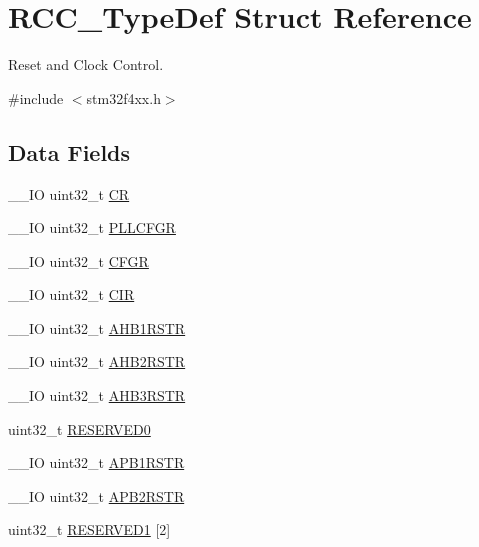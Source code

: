 \hypertarget{struct_r_c_c___type_def}{\section{R\-C\-C\-\_\-\-Type\-Def Struct Reference}
\label{struct_r_c_c___type_def}
}


Reset and Clock Control.  




{\ttfamily \#include $<$stm32f4xx.\-h$>$}

\subsection*{Data Fields}
\begin{DoxyCompactItemize}
\item 
\-\_\-\-\_\-\-I\-O uint32\-\_\-t \hyperlink{struct_r_c_c___type_def_ab40c89c59391aaa9d9a8ec011dd0907a}{C\-R}
\item 
\-\_\-\-\_\-\-I\-O uint32\-\_\-t \hyperlink{struct_r_c_c___type_def_ae6ff257862eba6b4b367feea786bf1fd}{P\-L\-L\-C\-F\-G\-R}
\item 
\-\_\-\-\_\-\-I\-O uint32\-\_\-t \hyperlink{struct_r_c_c___type_def_a26f1e746ccbf9c9f67e7c60e61085ec1}{C\-F\-G\-R}
\item 
\-\_\-\-\_\-\-I\-O uint32\-\_\-t \hyperlink{struct_r_c_c___type_def_a907d8154c80b7e385478943f90b17a3b}{C\-I\-R}
\item 
\-\_\-\-\_\-\-I\-O uint32\-\_\-t \hyperlink{struct_r_c_c___type_def_a46c20c598e9e12f919f0ea47ebcbc90f}{A\-H\-B1\-R\-S\-T\-R}
\item 
\-\_\-\-\_\-\-I\-O uint32\-\_\-t \hyperlink{struct_r_c_c___type_def_a78a5aa9dd5694c48a7d8e66888a46450}{A\-H\-B2\-R\-S\-T\-R}
\item 
\-\_\-\-\_\-\-I\-O uint32\-\_\-t \hyperlink{struct_r_c_c___type_def_a28560c5bfeb45326ea7f2019dba57bea}{A\-H\-B3\-R\-S\-T\-R}
\item 
uint32\-\_\-t \hyperlink{struct_r_c_c___type_def_af86c61a5d38a4fc9cef942a12744486b}{R\-E\-S\-E\-R\-V\-E\-D0}
\item 
\-\_\-\-\_\-\-I\-O uint32\-\_\-t \hyperlink{struct_r_c_c___type_def_a7da5d372374bc59e9b9af750b01d6a78}{A\-P\-B1\-R\-S\-T\-R}
\item 
\-\_\-\-\_\-\-I\-O uint32\-\_\-t \hyperlink{struct_r_c_c___type_def_ab2c5389c9ff4ac188cd498b8f7170968}{A\-P\-B2\-R\-S\-T\-R}
\item 
uint32\-\_\-t \hyperlink{struct_r_c_c___type_def_a28d88d9a08aab1adbebea61c42ef901e}{R\-E\-S\-E\-R\-V\-E\-D1} \mbox{[}2\mbox{]}

\end{DoxyCompactItemize}
